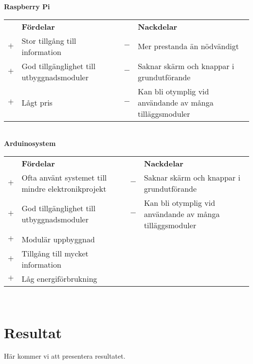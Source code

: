 \documentclass{article}
\begin{document}
            
        \noindent\textsf{\textbf{Raspberry Pi}}\\
        \begin{tabularx}{\textwidth}{@{}cXcX}
            & \textbf{Fördelar}     & & \textbf{Nackdelar} \\
            $+$ & Stor tillgång till information & 
                                    $-$ & Mer prestanda än nödvändigt \\
            $+$ & God tillgänglighet till utbyggnads\-moduler & 
                                    $-$ & Saknar skärm och knappar i 
                                          grundutförande \\
            $+$ & Lågt pris &       $-$ & Kan bli otymplig vid användande av   
                                        många tilläggsmoduler \\   
        \end{tabularx}\\

        \noindent\textsf{\textbf{Arduinosystem}}\\
        \begin{tabularx}{\textwidth}{@{}cXcX}
            & \textbf{Fördelar}     & & \textbf{Nackdelar} \\
            $+$ & Ofta använt systemet till mindre elektronikprojekt & 
                                    $-$ & Saknar skärm och knappar i 
                                        grundutförande \\
            $+$ & God tillgänglighet till utbyggnads\-moduler & 
                                    $-$ & Kan bli otymplig vid användande av   
                                        många tilläggsmoduler \\
            $+$ & Modulär uppbyggnad \\
            $+$ & Tillgång till mycket information \\
            $+$ & Låg energiförbrukning \\
        \end{tabularx} \\


    \section{Resultat} %
    \label{sec:resultat}
        Här kommer vi att presentera resultatet. \\
\end{document}
